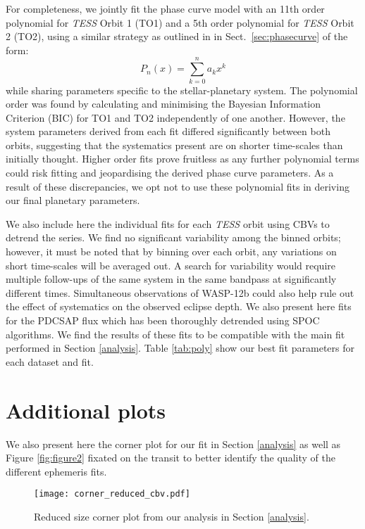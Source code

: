 \documentclass[fleqn,usenatbib]{mnras}
\begin{document}
For completeness, we jointly fit the phase curve model with an 11th order polynomial for \textit{TESS} Orbit 1 (TO1) and a 5th order polynomial for \textit{TESS} Orbit 2 (TO2), using a similar strategy as outlined in in Sect.~\ref{sec:phasecurve} of the form:
\begin{equation}
    P_{n}(x) = \sum_{k=0}^{n} a_{k} x^{k}
	\label{eq:polynomial}
\end{equation}
while sharing parameters specific to the stellar-planetary system. The polynomial order was found by calculating and minimising the Bayesian Information Criterion (BIC) for TO1 and TO2 independently of one another. However, the system parameters derived from each fit differed significantly between both orbits, suggesting that the systematics present are on shorter time-scales than initially thought. Higher order fits prove fruitless as any further polynomial terms could risk fitting and jeopardising the derived phase curve parameters. As a result of these discrepancies, we opt not to use these polynomial fits in deriving our final planetary parameters.

We also include here the individual fits for each \textit{TESS} orbit using CBVs to detrend the series. We find no significant variability among the binned orbits; however, it must be noted that by binning over each orbit, any variations on short time-scales will be averaged out. A search for variability would require multiple follow-ups of the same system in the same bandpass at significantly different times. Simultaneous observations of WASP-12b could also help rule out the effect of systematics on the observed eclipse depth. We also present here fits for the PDCSAP flux which has been thoroughly detrended using SPOC algorithms. We find the results of these fits to be compatible with the main fit performed in Section \ref{analysis}. Table \ref{tab:poly} show our best fit parameters for each dataset and fit.

\section{Additional plots}\label{app:2}

We also present here the corner plot for our fit in Section \ref{analysis} as well as Figure \ref{fig:figure2} fixated on the transit to better identify the quality of the different ephemeris fits.

\begin{figure*}
	\texttt{[image: corner\_reduced\_cbv.pdf]}
    \caption{Reduced size corner plot from our analysis in Section \ref{analysis}.}
\end{figure*}
\end{document}
